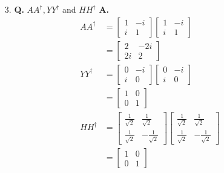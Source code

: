 \documentclass[main.tex]{subfiles}
\begin{document}
\begin{enumerate}
\begin{enumerate}
        \item[3.] \textbf{Q.} $A A^{\dagger}, Y Y^{\dagger}$ and $H H^{\dagger}$ \textbf{A.}
        \begin{align*}
            A A^{\dagger}   & = \left[\begin{array}{cc} 1 & -i \\ i & 1 \end{array}\right] \left[\begin{array}{cc} 1 & -i \\ i & 1 \end{array}\right]\\
                            & = \left[\begin{array}{cc} 2 & -2i \\ 2i & 2 \end{array}\right] \\
            Y Y^{\dagger}   & = \left[\begin{array}{cc} 0 & -i \\ i & 0 \end{array}\right] \left[\begin{array}{cc} 0 & -i \\ i & 0 \end{array}\right]\\
                            & = \left[\begin{array}{cc} 1 & 0 \\ 0 & 1 \end{array}\right]\\
            H H^{\dagger}   & = \left[\begin{array}{cc} \frac{1}{\sqrt{2}} & \frac{1}{\sqrt{2}} \\ \frac{1}{\sqrt{2}} & -\frac{1}{\sqrt{2}} \end{array} \right]
                                \left[\begin{array}{cc} \frac{1}{\sqrt{2}} & \frac{1}{\sqrt{2}} \\ \frac{1}{\sqrt{2}} & -\frac{1}{\sqrt{2}} \end{array} \right]\\
                            & = \left[\begin{array}{cc} 1 & 0 \\ 0 & 1 \end{array}\right]\\
        \end{align*}
        
    \end{enumerate}
    

\end{enumerate}
\end{document}
